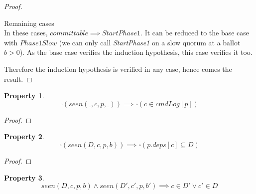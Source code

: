 \documentclass[a4paper]{article}
\theoremstyle{definition}
\theoremstyle{plain}
\newtheorem{property}{Property}
\begin{document}
\begin{proof}
\begin{case}
\begin{case}
            \item Remaining cases \\
            In these cases, $committable \implies StartPhase1$. It can be reduced to the base case with $Phase1Slow$ (we can only call \textit{StartPhase1} on a slow quorum at a ballot $b > 0$).
            As the base case verifies the induction hypothesis, this case verifies it too.


        \end{case}

    \end{case}
Therefore the induction hypothesis is verified in any case, hence comes the result.

\end{proof}

\begin{property}
\begin{equation*}
    \square(seen(\_,c,p,\_)) \implies \square(c \in cmdLog[p])
\end{equation*}
\end{property}

\begin{proof}
\end{proof}


\begin{property}
\begin{equation*}
    \square(seen(D,c,p,b)) \implies \square(p.deps[c] \subseteq D)
\end{equation*}
\end{property}

\begin{proof}
\end{proof}

\begin{property}
\begin{equation*}
    seen(D,c,p,b) \wedge seen(D',c',p,b') \implies c \in D' \vee c' \in D
\end{equation*}
\end{property}
\end{document}
